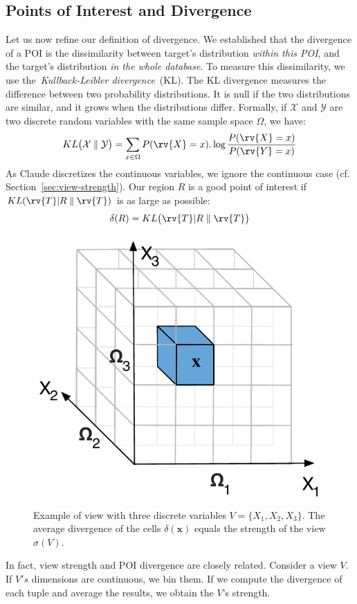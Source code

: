 \subsection{Points of Interest and Divergence}
Let us now refine our definition of divergence. We established that the
divergence of a POI is the dissimilarity between target's distribution
\emph{within this POI}, and the target's distribution \emph{in the whole
database}.  To measure this dissimilarity, we use the~\emph{Kullback-Leibler
divergence}~(KL).  The KL divergence measures the difference between two
probability distributions. It is null if the two distributions are similar, and
it grows when the distributions differ.  Formally, if $\mathcal{X}$ and
$\mathcal{Y}$ are two discrete random variables with the same sample space
$\Omega$, we have:
\begin{equation}\label{eq:KL_disc} 
    KL\big( \mathcal{X} \parallel \mathcal{Y} \big) = 
    \sum_{x\in \Omega} P(\rv{X} = x).\log{\frac{P(\rv{X} = x)}{P(\rv{Y} = x)}} 
\end{equation}
As Claude discretizes the continuous variables, we ignore the continuous case
(cf.  Section~\ref{sec:view-strength}). Our region $R$ is a good point of
interest if $KL ( \rv{T} |R \parallel \rv{T} )$ is as large as possible:
\begin{equation}\label{eq:divergence}
    \delta(R) = KL \big( \rv{T} | R \parallel \rv{T}\big)
\end{equation}
\begin{figure}[t!]
\centering
\includegraphics[width=0.4\columnwidth]{images/3Dtest}
\caption{Example of view with three discrete variables $V = \{X_1, X_2, X_3\}$.
The average divergence of the cells $\delta(\mathbf{x})$ equals the strength of
the view  $\sigma(V)$.}
\label{fig:binningexample}
\end{figure}
In fact, view strength and POI divergence are closely related.  Consider a
view $V$.  If $V's$ dimensions are continuous, we bin them. If we compute the
divergence of each tuple and average the results, we obtain the $V$'s strength.
